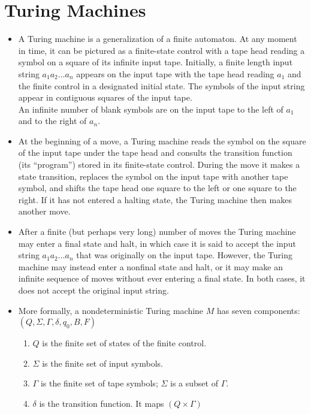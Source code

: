 \documentclass[]{article}
\begin{document}
\section{Turing Machines}
  \begin{itemize}
    \item A Turing machine is a generalization of a finite automaton. At any
    moment in time, it can be pictured as a finite-state control with a tape 
    head reading a symbol on a square of its infinite input tape. Initially, a
    finite length input string $a_1a_2\ldots{a_n}$ appears on the input tape
    with the tape head reading $a_1$ and the finite control in a designated
    initial state. The symbols of the input string appear in contiguous squares
    of the input tape. \\
    An infinite number of blank symbols are on the input tape to the left of 
    $a_1$ and to the right of $a_n$.
    \item At the beginning of a move, a Turing machine reads the symbol on the 
    square of the input tape under the tape head and consults the transition 
    function (its ``program'') stored in its finite-state control. During the 
    move it makes a state transition, replaces the symbol on the input tape 
    with another tape symbol, and shifts the tape head one square to the left 
    or one square to the right. If it has not entered a halting state, the 
    Turing machine then makes another move.
    \item After a finite (but perhaps very long) number of moves the Turing 
    machine may enter a final state and halt, in which case it is said to 
    accept the input string $a_1a_2\ldots{}a_n$ that was originally on the 
    input tape. However, the Turing machine may instead enter a nonfinal state 
    and halt, or it may make an infinite sequence of moves without ever 
    entering a final state. In both cases, it does not accept the original 
    input string.
    \item More formally, a nondeterministic Turing machine $M$ has seven 
    components: $(Q, \Sigma, \Gamma, \delta, q_0, B, F)$
      \begin{enumerate}
        \item $Q$ is the finite set of states of the finite control.
        \item $\Sigma$ is the finite set of input symbols.
        \item $\Gamma$ is the finite set of tape symbols; $\Sigma$ is a subset 
        of $\Gamma$.
        \item $\delta$ is the transition function. It maps $(Q \times \Gamma)$ 

\end{enumerate}
\end{itemize}
\end{document}
